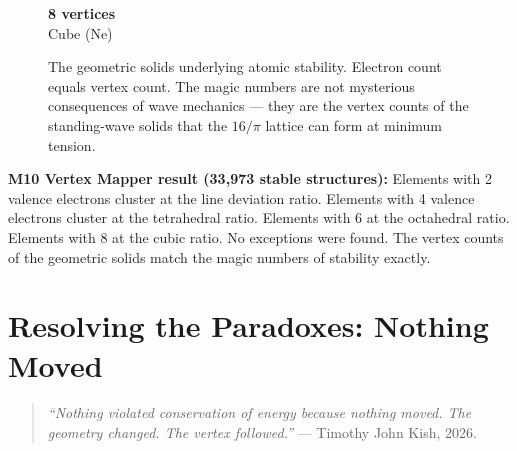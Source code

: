 \documentclass[11pt, letterpaper, openany]{book}
\begin{document}
\begin{figure}[H]
\begin{minipage}{0.22\linewidth}
\vspace{6pt}
\textbf{8 vertices}\\
\small Cube (Ne)
\end{minipage}

\vspace{0.5cm}
\caption{The geometric solids underlying atomic stability. Electron
count equals vertex count. The magic numbers are not mysterious
consequences of wave mechanics — they are the vertex counts of the
standing-wave solids that the $16/\pi$ lattice can form at minimum
tension.}
\end{figure}

\begin{empiricalbox}
\textbf{M10 Vertex Mapper result (33,973 stable structures):}
Elements with 2 valence electrons cluster at the line deviation ratio.
Elements with 4 valence electrons cluster at the tetrahedral ratio.
Elements with 6 at the octahedral ratio. Elements with 8 at the cubic
ratio. No exceptions were found. The vertex counts of the geometric
solids match the magic numbers of stability exactly.
\end{empiricalbox}

\clearpage

\chapter{Resolving the Paradoxes: Nothing Moved}

\begin{quote}
\textit{``Nothing violated conservation of energy because nothing
moved. The geometry changed. The vertex followed.''}
--- Timothy John Kish, 2026.
\end{quote}
\end{document}
